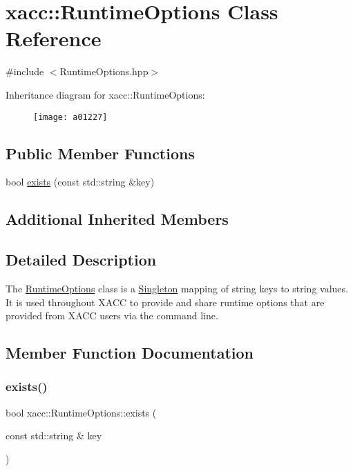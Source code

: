 \hypertarget{a01227}{}\section{xacc\+:\+:Runtime\+Options Class Reference}
\label{a01227}


{\ttfamily \#include $<$Runtime\+Options.\+hpp$>$}

Inheritance diagram for xacc\+:\+:Runtime\+Options\+:\begin{figure}[H]
\begin{center}
\leavevmode
\texttt{[image: a01227]}
\end{center}
\end{figure}
\subsection*{Public Member Functions}
\begin{DoxyCompactItemize}
\item 
bool \hyperlink{a01227_a3603aecb87461efedd0fabbef966c80c}{exists} (const std\+::string \&key)
\end{DoxyCompactItemize}
\subsection*{Additional Inherited Members}


\subsection{Detailed Description}
The \hyperlink{a01227}{Runtime\+Options} class is a \hyperlink{a01231}{Singleton} mapping of string keys to string values. It is used throughout X\+A\+CC to provide and share runtime options that are provided from X\+A\+CC users via the command line. 

\subsection{Member Function Documentation}
\mbox{\label{a01227_a3603aecb87461efedd0fabbef966c80c}} 
\subsubsection{\texorpdfstring{exists()}{exists()}}
{\footnotesize\ttfamily bool xacc\+::\+Runtime\+Options\+::exists (\begin{DoxyParamCaption}\item[{const std\+::string \&}]{key }\end{DoxyParamCaption})\hspace{0.3cm}{\ttfamily [inline]}}

